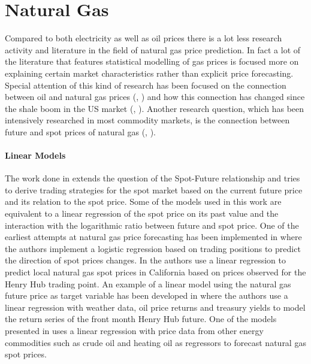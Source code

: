 \section{Natural Gas}
Compared to both electricity as well as oil prices there is a lot less research activity and literature in the field of natural gas price prediction. In fact a lot of the literature that features statistical modelling of gas prices is focused more on explaining certain market characteristics rather than explicit price forecasting. Special attention of this kind of research has been focused on the connection between oil and natural gas prices (\cite{villar_relationship_2006}, \cite{hartley_relationship_2008}) and how this connection has changed since the shale boom in the US market (\cite{geng_how_2016}, \cite{caporin_long-run_2017}). Another research question, which has been intensively researched in most commodity markets, is the connection between future and spot prices of natural gas (\cite{herbert_relation_1993}, \cite{chinn_predictive_2014}).

\paragraph{Linear Models}
The work done in \cite{mishra_are_2016} extends the question of the Spot-Future relationship and tries to derive trading strategies for the spot market based on the current future price and its relation to the spot price. Some of the models used in this work are equivalent to a linear regression of the spot price on its past value and the interaction with the logarithmic ratio between future and spot price. One of the earliest attempts at natural gas price forecasting has been implemented in 
\cite{buchanan_which_2001} where the authors implement a logistic regression based on trading positions to predict the direction of spot prices changes.
In \cite{woo_market_2006} the authors use a linear regression to predict local natural gas spot prices in California based on prices observed for the Henry Hub trading point. An example of a linear model using the natural gas future price as target variable has been developed in \cite{mu_weather_2007} where the authors use a linear regression with weather data, oil price returns and treasury yields to model the return series of the front month Henry Hub future. One of the models presented in \cite{malliaris_forecasting_2008} uses a linear regression with price data from other energy commodities such as crude oil and heating oil as regressors to forecast natural gas spot prices. 

